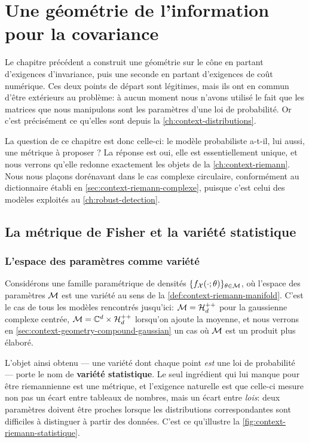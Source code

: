 \chapter{Une géométrie de l'information pour la covariance}
\label{ch:context-geometry}

Le chapitre précédent a construit une géométrie sur le cône en partant d'exigences d'invariance, puis une seconde en partant d'exigences de coût numérique. Ces deux points de départ sont légitimes, mais ils ont en commun d'être extérieurs au problème: à aucun moment nous n'avons utilisé le fait que les matrices que nous manipulons sont les paramètres d'une loi de probabilité. Or c'est précisément ce qu'elles sont depuis la \cref{ch:context-distributions}.

La question de ce chapitre est donc celle-ci: le modèle probabiliste a-t-il, lui aussi, une métrique à proposer ? La réponse est oui, elle est essentiellement unique, et nous verrons qu'elle redonne exactement les objets de la \cref{ch:context-riemann}. Nous nous plaçons dorénavant dans le cas complexe circulaire, conformément au dictionnaire établi en \cref{sec:context-riemann-complexe}, puisque c'est celui des modèles exploités au \cref{ch:robust-detection}.


\section{La métrique de Fisher et la variété statistique}
\label{sec:context-geometry-fisher}

\subsection{L'espace des paramètres comme variété}

Considérons une famille paramétrique de densités $\{f_{\mathcal{X}}(\cdot;\theta)\}_{\theta\in\mathcal{M}}$, où l'espace des paramètres $\mathcal{M}$ est une variété au sens de la \cref{def:context-riemann-manifold}. C'est le cas de tous les modèles rencontrés jusqu'ici: $\mathcal{M}=\mathcal{H}_{d}^{++}$ pour la gaussienne complexe centrée, $\mathcal{M}=\mathbb{C}^d\times\mathcal{H}_{d}^{++}$ lorsqu'on ajoute la moyenne, et nous verrons en \cref{sec:context-geometry-compound-gaussian} un cas où $\mathcal{M}$ est un produit plus élaboré.

L'objet ainsi obtenu --- une variété dont chaque point \emph{est} une loi de probabilité --- porte le nom de \textbf{variété statistique}. Le seul ingrédient qui lui manque pour être riemannienne est une métrique, et l'exigence naturelle est que celle-ci mesure non pas un écart entre tableaux de nombres, mais un écart entre \emph{lois}: deux paramètres doivent être proches lorsque les distributions correspondantes sont difficiles à distinguer à partir des données. C'est ce qu'illustre la \cref{fig:context-riemann-statistique}.

